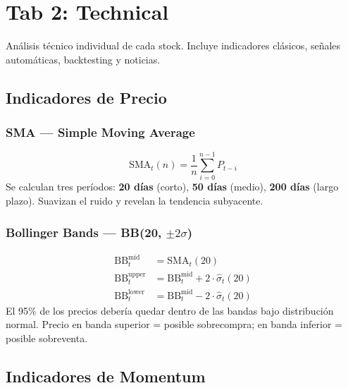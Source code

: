 \documentclass[11pt, a4paper]{article}
\begin{document}
\newpage

\section{Tab 2: Technical}

Análisis técnico individual de cada stock. Incluye indicadores clásicos, señales automáticas, backtesting y noticias.

\subsection{Indicadores de Precio}

\subsubsection{SMA — Simple Moving Average}

\begin{formulabox}[{SMA(n)}]
  \[ \text{SMA}_t(n) = \frac{1}{n} \sum_{i=0}^{n-1} P_{t-i} \]
  Se calculan tres períodos: \textbf{20 días} (corto), \textbf{50 días} (medio), \textbf{200 días} (largo plazo). Suavizan el ruido y revelan la tendencia subyacente.
\end{formulabox}

\subsubsection{Bollinger Bands — BB(20, $\pm 2\sigma$)}

\begin{formulabox}
  \begin{align}
    \text{BB}^{\text{mid}}_t  &= \text{SMA}_t(20) \\
    \text{BB}^{\text{upper}}_t &= \text{BB}^{\text{mid}}_t + 2 \cdot \hat{\sigma}_t(20) \\
    \text{BB}^{\text{lower}}_t &= \text{BB}^{\text{mid}}_t - 2 \cdot \hat{\sigma}_t(20)
  \end{align}
  El 95\% de los precios debería quedar dentro de las bandas bajo distribución normal. Precio en banda superior = posible sobrecompra; en banda inferior = posible sobreventa.
\end{formulabox}

\subsection{Indicadores de Momentum}
\end{document}
